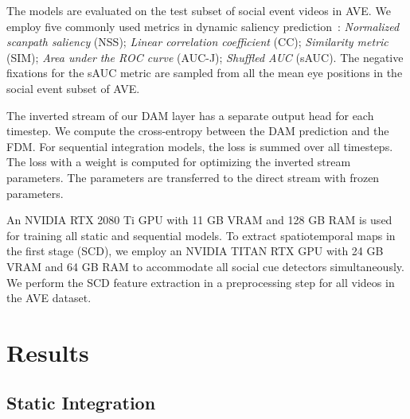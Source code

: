 \documentclass{article}
\begin{document}
The models are evaluated on the test subset of social event videos in AVE.
We employ five commonly used metrics in dynamic saliency prediction~\cite{tavakoli2020deep,tsiami2020stavis}: 
\textit{Normalized scanpath saliency} (NSS); \textit{Linear correlation coefficient} (CC); \textit{Similarity metric} (SIM); \textit{Area under the ROC curve} (AUC-J); \textit{Shuffled AUC} (sAUC). The negative fixations for the sAUC metric are sampled from all the mean eye positions in the social event subset of AVE.

The inverted stream of our DAM layer has a separate output head for each timestep. We compute the cross-entropy between the DAM prediction and the FDM. For sequential integration models, the loss is summed over all timesteps. The loss  with a weight  is computed for optimizing the inverted stream parameters. The parameters are transferred to the direct stream with frozen parameters.


An NVIDIA RTX 2080 Ti GPU with 11 GB VRAM and 128 GB RAM is used for training all static and sequential models. To extract spatiotemporal maps in the first stage (SCD), we employ an NVIDIA TITAN RTX GPU with 24 GB VRAM and 64 GB RAM to accommodate all social cue detectors simultaneously. We perform the SCD feature extraction in a preprocessing step for all videos in the AVE dataset. 
 
\section{Results}
\label{sec:results}

\subsection{Static Integration}
\end{document}
